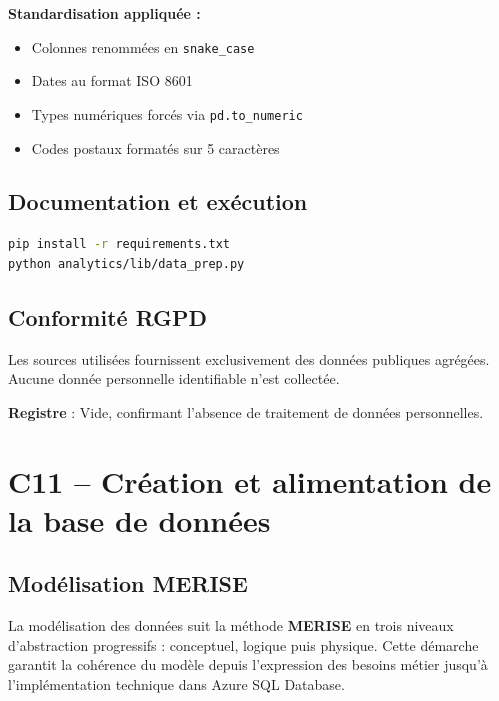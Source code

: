 \documentclass[12pt,a4paper]{article}
\begin{document}
\textbf{Standardisation appliquée :}
\begin{itemize}
    \item Colonnes renommées en \texttt{snake\_case}
    \item Dates au format ISO 8601
    \item Types numériques forcés via \texttt{pd.to\_numeric}
    \item Codes postaux formatés sur 5 caractères
\end{itemize}

\subsection{Documentation et exécution}

\begin{lstlisting}[language=bash]
pip install -r requirements.txt
python analytics/lib/data_prep.py
\end{lstlisting}

\subsection{Conformité RGPD}

Les sources utilisées fournissent exclusivement des données publiques agrégées. Aucune donnée personnelle identifiable n'est collectée.

\textbf{Registre} : Vide, confirmant l'absence de traitement de données personnelles.

\section{C11 -- Création et alimentation de la base de données}

\subsection{Modélisation MERISE}

La modélisation des données suit la méthode \textbf{MERISE} en trois niveaux d'abstraction progressifs : conceptuel, logique puis physique. Cette démarche garantit la cohérence du modèle depuis l'expression des besoins métier jusqu'à l'implémentation technique dans Azure SQL Database.

\end{document}
